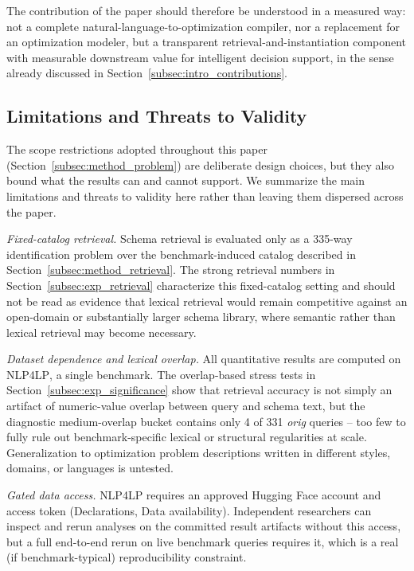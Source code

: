 \documentclass[pdflatex,sn-basic,Numbered]{sn-jnl}
\begin{document}
The contribution of the paper should therefore be understood in a measured way: not a complete natural-language-to-optimization compiler, nor a replacement for an optimization modeler, but a transparent retrieval-and-instantiation component with measurable downstream value for intelligent decision support, in the sense already discussed in Section~\ref{subsec:intro_contributions}.

\subsection{Limitations and Threats to Validity}
\label{subsec:limitations}

The scope restrictions adopted throughout this paper (Section~\ref{subsec:method_problem}) are deliberate design choices, but they also bound what the results can and cannot support. We summarize the main limitations and threats to validity here rather than leaving them dispersed across the paper.

\emph{Fixed-catalog retrieval.} Schema retrieval is evaluated only as a 335-way identification problem over the benchmark-induced catalog described in Section~\ref{subsec:method_retrieval}. The strong retrieval numbers in Section~\ref{subsec:exp_retrieval} characterize this fixed-catalog setting and should not be read as evidence that lexical retrieval would remain competitive against an open-domain or substantially larger schema library, where semantic rather than lexical retrieval may become necessary.

\emph{Dataset dependence and lexical overlap.} All quantitative results are computed on \textsc{NLP4LP}, a single benchmark. The overlap-based stress tests in Section~\ref{subsec:exp_significance} show that retrieval accuracy is not simply an artifact of numeric-value overlap between query and schema text, but the diagnostic medium-overlap bucket contains only 4 of 331 \emph{orig} queries -- too few to fully rule out benchmark-specific lexical or structural regularities at scale. Generalization to optimization problem descriptions written in different styles, domains, or languages is untested.

\emph{Gated data access.} \textsc{NLP4LP} requires an approved Hugging Face account and access token (Declarations, Data availability). Independent researchers can inspect and rerun analyses on the committed result artifacts without this access, but a full end-to-end rerun on live benchmark queries requires it, which is a real (if benchmark-typical) reproducibility constraint.
\end{document}
